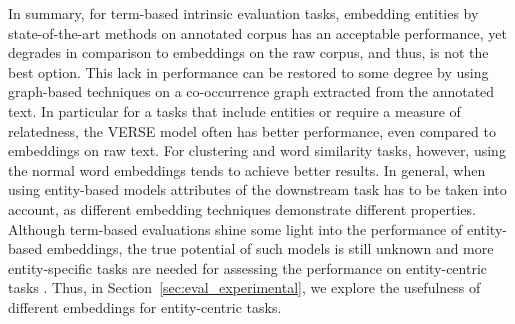 In summary, for term-based intrinsic evaluation tasks, embedding  entities by state-of-the-art methods on annotated corpus has an acceptable performance, yet degrades in comparison to embeddings on the raw corpus, and thus, is not the best option. This lack in performance can be  restored to some degree by using graph-based techniques on a co-occurrence graph extracted from the annotated text.  In particular for a tasks that include entities or require a measure of relatedness, the VERSE model often has better performance, even compared to  embeddings on raw text. For clustering and word similarity tasks, however, using the normal word embeddings tends to achieve better results. In general, when using entity-based models attributes of the downstream task has to be taken into account, as different embedding techniques demonstrate different properties. \\
Although term-based evaluations shine some light into the performance of entity-based embeddings, the true potential of such models is still unknown and more entity-specific tasks are needed for assessing the performance on entity-centric tasks . Thus, in Section~\ref{sec:eval_experimental}, we explore the usefulness of different embeddings for entity-centric tasks.
